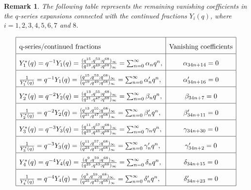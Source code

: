 \documentclass[11pt,a4paper]{article}
\numberwithin{equation}{section}
\theoremstyle{plain}
\newtheorem{remark}{Remark}[section]
\begin{document}
	\begin{remark}
		The following table represents the remaining vanishing coefficients in the $q$-series expansions connected with the continued fractions ${Y_i(q)}$, where $i=1,2,3,4,5,6,7$ and $8$.
	\end{remark}
	\[
	\renewcommand{\arraystretch}{2}
	\begin{array}{|l|c|}
		\hline
		\text{q-series/continued fractions} & \text{Vanishing coefficients} \\ 
		\hline
		{Y_1^*(q)} = q^{-1} Y_1(q)
		= \frac{(q^{15}, q^{53}; q^{68})_\infty}{(q^{19}, q^{49}; q^{68})_\infty}
		= \sum_{n=0}^{\infty} \alpha_n q^n,
		& \alpha_{34n+14} = 0 \\ 
		\hline
		
		
		\frac{1}{{Y}_1^*(q)} = q^{-1} Y_1(q)
		= \frac{(q^{15}, q^{53}; q^{68})_\infty}{(q^{19}, q^{49}; q^{68})_\infty}
		= \sum_{n=0}^{\infty} \alpha'_n q^n,
		& \alpha'_{34n+16} = 0 \\ 
		\hline
		
		{Y_2^*(q)} = q^{-2} Y_2(q)
		= \frac{(q^{13}, q^{55}; q^{68})_\infty}{(q^{21}, q^{47}; q^{68})_\infty}
		= \sum_{n=0}^{\infty} \beta_n q^n,
		& \beta_{34n+7} = 0 \\ 
		\hline
		
		
		\frac{1}{{Y}_2^*(q)} = q^{-2} Y_2(q)
		= \frac{(q^{13}, q^{55}; q^{68})_\infty}{(q^{21}, q^{47}; q^{68})_\infty}
		= \sum_{n=0}^{\infty} \beta'_n q^n,
		& \beta'_{34n+11} = 0 \\ 
		\hline
		
		{Y_3^*(q)} = q^{-3} Y_3(q)
		= \frac{(q^{11}, q^{57}; q^{68})_\infty}{(q^{23}, q^{45}; q^{68})_\infty}
		= \sum_{n=0}^{\infty} \gamma_n q^n,
		& \gamma_{34n+30} = 0 \\ 
		\hline
		
		
		\frac{1}{{Y}_3^*(q)} = q^{-3} Y_3(q)
		= \frac{(q^{11}, q^{57}; q^{68})_\infty}{(q^{23}, q^{45}; q^{68})_\infty}
		= \sum_{n=0}^{\infty} \gamma'_n q^n,
		& \gamma'_{34n+2} = 0 \\ 
		\hline
		
		{Y_4^*(q)} = q^{-4} Y_4(q)
		= \frac{(q^{9}, q^{59}; q^{68})_\infty}{(q^{25}, q^{43}; q^{68})_\infty}
		= \sum_{n=0}^{\infty} \delta_n q^n,
		& \delta_{34n+15} = 0 \\ 
		\hline
		
		
		\frac{1}{{Y}_4^*(q)} = q^{-4} Y_4(q)
		= \frac{(q^{9}, q^{59}; q^{68})_\infty}{(q^{25}, q^{43}; q^{68})_\infty}
		= \sum_{n=0}^{\infty} \delta'_n q^n,
		& \delta'_{34n+23} = 0 \\ 
		\hline
		

\end{array}\]
\end{document}
